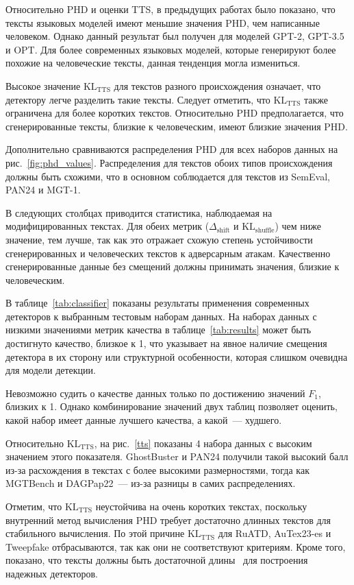 Относительно PHD и оценки TTS, в предыдущих работах было показано, что тексты языковых моделей имеют меньшие значения PHD, чем написанные человеком.
Однако данный результат был получен для моделей GPT-2, GPT-3.5 и OPT.
Для более современных языковых моделей, которые генерируют более похожие на человеческие тексты, данная тенденция могла измениться.

Высокое значение $\text{KL}_{\text{TTS}}$ для текстов разного происхождения означает, что детектору легче разделить такие тексты.
Следует отметить, что $\text{KL}_{\text{TTS}}$ также ограничена для более коротких текстов.
Относительно PHD предполагается, что сгенерированные тексты, близкие к человеческим, имеют близкие значения PHD.

Дополнительно сравниваются распределения PHD для всех наборов данных на рис.~\ref{fig:phd_values}.
Распределения для текстов обоих типов происхождения должны быть схожими, что в основном соблюдается для текстов из SemEval, PAN24 и MGT-1.

В следующих столбцах приводится статистика, наблюдаемая на модифицированных текстах.
Для обеих метрик ($\Delta_{\text{shift}}$ и $\text{KL}_\text{shuffle}$) чем ниже значение, тем лучше, так как это отражает схожую степень устойчивости сгенерированных и человеческих текстов к адверсарным атакам.
Качественно сгенерированные данные без смещений должны принимать значения, близкие к человеческим.

В таблице~\ref{tab:classifier} показаны результаты применения современных детекторов к выбранным тестовым наборам данных.
На наборах данных с низкими значениями метрик качества в таблице~\ref{tab:results} может быть достигнуто качество, близкое к 1, что указывает на явное наличие смещения детектора в их сторону или структурной особенности, которая слишком очевидна для модели детекции.

Невозможно судить о качестве данных только по достижению значений $F_1$, близких к 1.
Однако комбинирование значений двух таблиц позволяет оценить, какой набор имеет данные лучшего качества, а какой~--- худшего.

Относительно $\text{KL}_{\text{TTS}}$, на рис.~\ref{tts} показаны 4 набора данных с высоким значением этого показателя.
GhostBuster и PAN24 получили такой высокий балл из-за расхождения в текстах с более высокими размерностями, тогда как MGTBench и DAGPap22~--- из-за разницы в самих распределениях.

Отметим, что $\text{KL}_{\text{TTS}}$ неустойчива на очень коротких текстах, поскольку внутренний метод вычисления PHD требует достаточно длинных текстов для стабильного вычисления.
По этой причине $\text{KL}_{\text{TTS}}$ для RuATD, AuTex23-es и Tweepfake отбрасываются, так как они не соответствуют критериям.
Кроме того, показано, что тексты должны быть достаточной длины~\cite{gritsay2022automatic526652068} для построения надежных детекторов.

